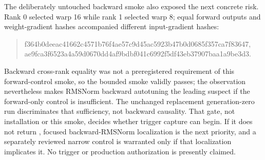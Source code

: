 \documentclass[11pt]{article}
\let\pathcode\path
\begin{document}
The deliberately untouched backward smoke also exposed the next concrete risk.  Rank 0 selected
warp 16 while rank 1 selected warp 8; equal forward outputs and weight-gradient hashes accompanied
different input-gradient hashes:
\begin{quote}
{\ttfamily\scriptsize f364b0deeac41662c4571b76f4ae57c9d45ac5923b47b0d0685f357ca7f83647},\\
{\ttfamily\scriptsize ae9fca3f6523a4a59d0670dd4af9bdbf041c6992f5df43eb37907baa1a9be3d3}.
\end{quote}
Backward cross-rank equality was not a preregistered requirement of this forward-control smoke, so
the bounded smoke validly passes; the observation nevertheless makes RMSNorm backward autotuning
the leading suspect if the forward-only control is insufficient.  The unchanged replacement
generation-zero run discriminates that sufficiency, not backward causality.  That gate, not
installation or this smoke, decides whether trigger capture can begin.  If it does not return
\pathcode{minimal=MATCHED}, focused backward-RMSNorm localization is the next priority, and a
separately reviewed narrow control is warranted only if that localization implicates it.  No
trigger or production authorization is presently claimed.
\end{document}

